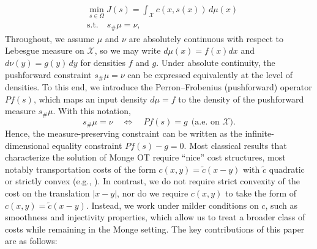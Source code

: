\documentclass[12pt,leqno]{amsart}
\begin{document}
\begin{align*}
    &\min_{s\in\Omega} J(s)=\int_{\mathcal{X}} c(x,s(x))\,d\mu(x)\\
    &\text{s.t.}\quad s_\#\mu=\nu,
\end{align*}
Throughout, we assume $\mu$ and $\nu$ are absolutely continuous with respect to Lebesgue measure on $\mathcal{X}$,
so we may write $d\mu(x)=f(x)dx$ and $d\nu(y)=g(y)\,dy$ for densities $f$ and $g$.
Under absolute continuity, the pushforward constraint $s_{\#}\mu=\nu$ can be expressed equivalently at the level of
densities. To this end, we introduce the Perron--Frobenius (pushforward) operator $Pf(s)$, which maps an input density
$d\mu=f$ to the density of the pushforward measure $s_{\#}\mu$. With this notation,
\[
s_{\#}\mu=\nu
\quad \Longleftrightarrow \quad
Pf(s) = g \ \ \text{(a.e. on } \mathcal{X}\text{)}.
\]
Hence, the measure-preserving constraint can be written as the infinite-dimensional equality constraint
$Pf(s) - g = 0$.
Most classical results that characterize the solution of Monge OT require ``nice'' cost structures, most notably transportation costs of the form $c(x,y)=\tilde c(x-y)$ with $\tilde c$ quadratic or strictly convex
(e.g., \cite{brenier1991polar,GangboMcCann1996}).
In contrast, we do not require strict convexity of the cost on the translation $|x-y|$, nor do we require $c(x, y)$ to take the form of $c(x,y)=\tilde c(x-y)$.
Instead, we work under milder conditions on $c$, such as smoothness and injectivity properties, which allow us to treat a broader class of costs while remaining in the Monge setting. The key contributions of this paper are as follows:

\end{document}
